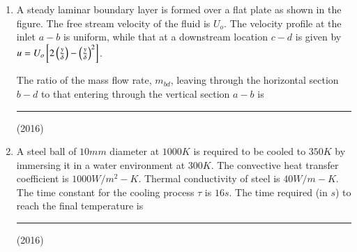 \documentclass[journal]{IEEEtran}
\begin{document}
\begin{enumerate}
\item A steady laminar boundary layer is formed over a flat plate as shown in the figure. The free stream velocity of the fluid is $U_{o}$. The velocity profile at the inlet $a-b$ is uniform, while that at a downstream location $c-d$ is given by $u=U_{o}{}\left[2\left(\frac{y}{\delta}\right)-\left(\frac{y}{\delta}\right)^{2}\right]$.


The ratio of the mass flow rate, $m_{bd}$, leaving through the horizontal section $b-d$ to that entering through the vertical section $a-b$ is \rule{1cm}{0.15mm} \hfill(2016)


\item A steel ball of $10mm$ diameter at $1000K$ is required to be cooled to $350K$ by immersing it in a water environment at $300K$. The convective heat transfer coefficient is $1000 W/m^{2}-K$. Thermal conductivity of steel is $40W/m-K$. The time constant for the cooling process $\tau$ is $16s$. The time required (in $s$) to reach the final temperature is \rule{1cm}{0.15mm} \hfill(2016)
\end{enumerate}
\end{document}
